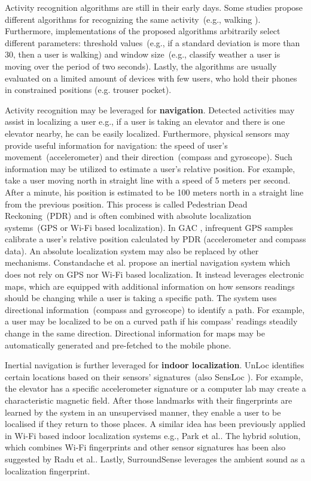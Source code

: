 Activity recognition algorithms are still in their early days. Some studies propose different algorithms for recognizing the same activity\ (e.g., walking \cite{benabdesslem:senseless} \cite{rachuri:socialsense} \cite{Kwapisz2011} ). Furthermore, implementations of the proposed algorithms arbitrarily select different parameters: threshold values\ (e.g., if a standard deviation is more than 30, then a user is walking) and window size\ (e.g., classify weather a user is moving over the period of two seconds). Lastly, the algorithms are usually evaluated on a limited amount of devices with few users, who hold their phones in constrained positions (e.g. trouser pocket). 

Activity recognition may be leveraged for \textbf{navigation}. Detected activities may assist in localizing a user e.g., if a user is taking an elevator and there is one elevator nearby, he can be easily localized. Furthermore, physical sensors may provide useful information for navigation: the speed of user's movement\ (accelerometer) and their direction\ (compass and gyroscope). Such information may be utilized to estimate a user's relative position. For example, take a user moving north in straight line with a speed of 5 meters per second. After a minute, his position is estimated to be 100 meters north in a straight line from the previous position.  This process is called Pedestrian Dead Reckoning\ (PDR) and is often combined with absolute localization systems\ (GPS or Wi-Fi based localization). In GAC \cite{youssef:gac}, infrequent GPS samples calibrate a user's relative position calculated by PDR (accelerometer and compass data). An absolute localization system may also be replaced by other mechanisms. Constandache et al.\cite{constandache:localization} propose an inertial navigation system which does not rely on GPS nor Wi-Fi based localization. It instead leverages electronic maps, which are equipped with additional information on how sensors readings should be changing while a user is taking a specific path. The system uses directional information\ (compass and gyroscope) to identify a path. For example, a user may be localized to be on a curved path if his compass' readings steadily change in the same direction. Directional information for maps may be automatically generated and pre-fetched to the mobile phone.

Inertial navigation is further leveraged for \textbf{indoor localization}. UnLoc \cite{Wang:unsupervised} identifies certain locations based on their sensors' signatures\ (also SensLoc \cite{kim:sensloc} ). For example, the elevator has a specific accelerometer signature or a computer lab may create a characteristic magnetic field. After those landmarks with their fingerprints are learned by the system in an unsupervised manner, they enable a user to be localised if they return to those places. A similar idea has been previously applied in Wi-Fi based indoor localization systems e.g., Park et al.\cite{park:organic}. The hybrid solution, which combines Wi-Fi fingerprints and other sensor signatures has been also suggested by Radu et al.\cite{radu:hybrid}. Lastly, SurroundSense \cite{azizyan:surroundsense} leverages the ambient sound as a localization fingerprint.

